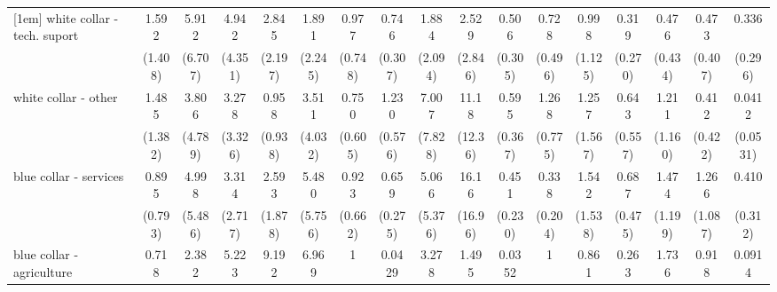 {\begin{tabular}{l*{16}{c}}
[1em]
white collar - tech. suport&       1.592         &       5.912         &       4.942         &       2.845         &       1.891         &       0.977         &       0.746         &       1.884         &       2.529         &       0.506         &       0.728         &       0.998         &       0.319         &       0.476         &       0.473         &       0.336         \\
                    &     (1.408)         &     (6.707)         &     (4.351)         &     (2.197)         &     (2.245)         &     (0.748)         &     (0.307)         &     (2.094)         &     (2.846)         &     (0.305)         &     (0.496)         &     (1.125)         &     (0.270)         &     (0.434)         &     (0.407)         &     (0.296)         \\
[1em]
white collar - other&       1.485         &       3.806         &       3.278         &       0.958         &       3.511         &       0.750         &       1.230         &       7.007         &       11.18\sym{*}  &       0.595         &       1.268         &       1.257         &       0.643         &       1.211         &       0.412         &      0.0412\sym{*}  \\
                    &     (1.382)         &     (4.789)         &     (3.326)         &     (0.938)         &     (4.032)         &     (0.605)         &     (0.576)         &     (7.828)         &     (12.36)         &     (0.367)         &     (0.775)         &     (1.567)         &     (0.557)         &     (1.160)         &     (0.422)         &    (0.0531)         \\
[1em]
blue collar - services&       0.895         &       4.998         &       3.314         &       2.593         &       5.480         &       0.923         &       0.659         &       5.066         &       16.16\sym{**} &       0.451         &       0.338         &       1.542         &       0.687         &       1.474         &       1.266         &       0.410         \\
                    &     (0.793)         &     (5.486)         &     (2.717)         &     (1.878)         &     (5.756)         &     (0.662)         &     (0.275)         &     (5.376)         &     (16.96)         &     (0.230)         &     (0.204)         &     (1.538)         &     (0.475)         &     (1.199)         &     (1.087)         &     (0.312)         \\
[1em]
blue collar - agriculture&       0.718         &       2.382         &       5.223         &       9.192\sym{*}  &       6.969         &           1         &      0.0429\sym{**} &       3.278         &       1.495         &      0.0352\sym{**} &           1         &       0.861         &       0.263         &       1.736         &       0.918         &      0.0914\sym{*}  \\

\end{tabular}}
